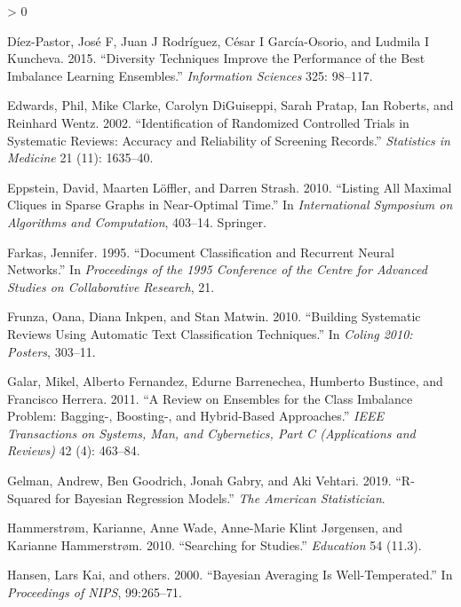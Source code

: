 \documentclass{article}
\newlength{\cslhangindent}
\newenvironment{CSLReferences}[2] %
 {%
  \setlength{\parindent}{0pt}
  \ifodd #1 \everypar{\setlength{\hangindent}{\cslhangindent}}\ignorespaces\fi
  \ifnum #2 > 0
  \setlength{\parskip}{#2\baselineskip}
  \fi
 }%
 {}
\begin{document}
\begin{CSLReferences}{1}{0}
\leavevmode\hypertarget{ref-diez2015diversity}{}%
Díez-Pastor, José F, Juan J Rodríguez, César I García-Osorio, and
Ludmila I Kuncheva. 2015. {``Diversity Techniques Improve the
Performance of the Best Imbalance Learning Ensembles.''}
\emph{Information Sciences} 325: 98--117.

\leavevmode\hypertarget{ref-edwards2002identification}{}%
Edwards, Phil, Mike Clarke, Carolyn DiGuiseppi, Sarah Pratap, Ian
Roberts, and Reinhard Wentz. 2002. {``Identification of Randomized
Controlled Trials in Systematic Reviews: Accuracy and Reliability of
Screening Records.''} \emph{Statistics in Medicine} 21 (11): 1635--40.

\leavevmode\hypertarget{ref-eppstein2010listing}{}%
Eppstein, David, Maarten Löffler, and Darren Strash. 2010. {``Listing
All Maximal Cliques in Sparse Graphs in Near-Optimal Time.''} In
\emph{International Symposium on Algorithms and Computation}, 403--14.
Springer.

\leavevmode\hypertarget{ref-farkas1995document}{}%
Farkas, Jennifer. 1995. {``Document Classification and Recurrent Neural
Networks.''} In \emph{Proceedings of the 1995 Conference of the Centre
for Advanced Studies on Collaborative Research}, 21.

\leavevmode\hypertarget{ref-frunza2010building}{}%
Frunza, Oana, Diana Inkpen, and Stan Matwin. 2010. {``Building
Systematic Reviews Using Automatic Text Classification Techniques.''} In
\emph{Coling 2010: Posters}, 303--11.

\leavevmode\hypertarget{ref-galar2011review}{}%
Galar, Mikel, Alberto Fernandez, Edurne Barrenechea, Humberto Bustince,
and Francisco Herrera. 2011. {``A Review on Ensembles for the Class
Imbalance Problem: Bagging-, Boosting-, and Hybrid-Based Approaches.''}
\emph{IEEE Transactions on Systems, Man, and Cybernetics, Part C
(Applications and Reviews)} 42 (4): 463--84.

\leavevmode\hypertarget{ref-gelman2019r}{}%
Gelman, Andrew, Ben Goodrich, Jonah Gabry, and Aki Vehtari. 2019.
{``R-Squared for Bayesian Regression Models.''} \emph{The American
Statistician}.

\leavevmode\hypertarget{ref-hammerstrom2010searching}{}%
Hammerstrøm, Karianne, Anne Wade, Anne-Marie Klint Jørgensen, and
Karianne Hammerstrøm. 2010. {``Searching for Studies.''}
\emph{Education} 54 (11.3).

\leavevmode\hypertarget{ref-hansen2000bayesian}{}%
Hansen, Lars Kai, and others. 2000. {``Bayesian Averaging Is
Well-Temperated.''} In \emph{Proceedings of NIPS}, 99:265--71.


\end{CSLReferences}
\end{document}
